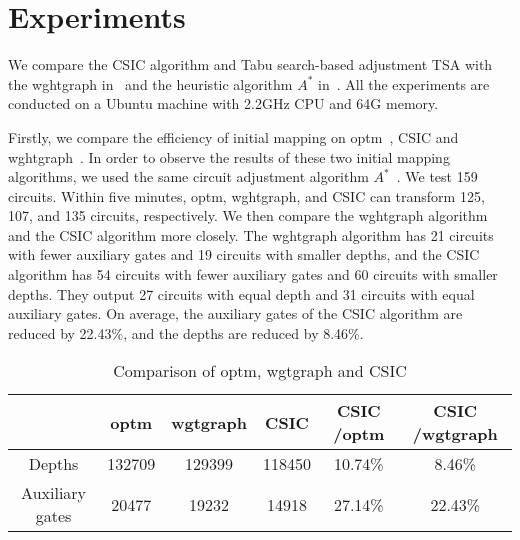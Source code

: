 \documentclass[journal]{IEEEtran}
\begin{document}
	\section{Experiments}
	\label{Experiment}
	We compare the  CSIC  algorithm 
	and Tabu search-based adjustment TSA with the wghtgraph in~\cite{2020Qubit} and the heuristic algorithm $ A^{*}$  in~\cite{Zulehner2017}.
	All the experiments are conducted on a Ubuntu machine with 2.2GHz CPU and 64G memory. 
	
	Firstly, we compare the efficiency of initial mapping on optm~\cite{Zulehner2017},  CSIC and wghtgraph~\cite{2020Qubit}. In order to  observe the results of these two initial mapping algorithms, we used the same circuit adjustment algorithm $A^{*}$~\cite{Zulehner2017}.
	We test 159 circuits. Within five minutes, optm,  wghtgraph, and CSIC can transform 125, 107, and  135 circuits, respectively. %
	We then compare the wghtgraph algorithm and the CSIC algorithm more closely. The wghtgraph algorithm has 21 circuits with fewer auxiliary gates  and 19 circuits with smaller depths, and the CSIC algorithm has 54 circuits with fewer auxiliary gates and 60 circuits with  smaller depths. They output 27 circuits with equal depth and  31 circuits with equal auxiliary gates. On average, the auxiliary gates of the CSIC algorithm are reduced by 22.43\%, 
	and the depths are reduced by 8.46\%.
	\begin{table*}[htbp]
		\begin{center}  
			\begin{tabular}{|c|c|c|c|c|c|}
				\hline
				&  optm & wgtgraph &CSIC & CSIC /optm & CSIC /wgtgraph\\
				\hline
				Depths 	&	132709	&   129399	&  118450 	& 10.74\%  &8.46\%   \\
				\hline
				Auxiliary gates 	&	20477	&  19232 	&  14918 & 27.14\% 	&  22.43\%  \\
				\hline
			\end{tabular} 
		\end{center} 
		\caption{Comparison of optm, wgtgraph and CSIC}
		\label{tab1}
	\end{table*}
\end{document}
